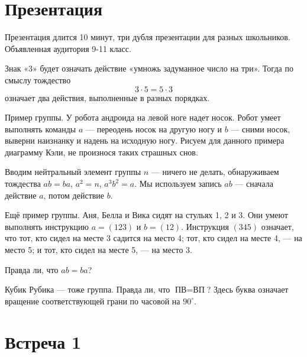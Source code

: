 \documentclass[a4paper, 12pt]{article}
\begin{document}
\section{Презентация}

Презентация длится 10 минут, три дубля презентации для разных школьников. 
Объявленная аудитория 9-11 класс.

Знак «3» будет означать действие «умножь задуманное число на три». Тогда по смыслу тождество
\[
3 \cdot 5 = 5 \cdot 3
\]
означает два действия, выполненные в разных порядках.

Пример группы. У робота андроида на левой ноге надет носок. Робот умеет выполнять команды $a$ — переодень носок на другую ногу и $b$ — сними носок, выверни наизнанку и надень на исходную ногу. Рисуем для данного примера диаграмму Кэли, не произнося таких страшных снов.

Вводим нейтральный элемент группы $n$ — ничего не делать, обнаруживаем тождества $ab=ba$, $a^2=n$, $a^3b^2=a$. Мы используем запись $ab$ — сначала действие $a$, потом действие $b$.

Ещё пример группы. Аня, Белла и Вика сидят на стульях 1, 2 и 3. Они умеют выполнять инструкцию $a=(123)$ и $b=(12)$. Инструкция $(345)$ означает, что тот, кто сидел на месте 3 садится на место 4; тот, кто сидел на месте 4, — на место 5; и тот, кто сидел на месте 5, — на место 3.

Правда ли, что $ab=ba$?

Кубик Рубика — тоже группа. Правда ли, что $\text{П}\text{В}=\text{В}\text{П}$? Здесь буква означает вращение соответствующей грани по часовой на $90^{\circ}$.

\section{Встреча 1}
\end{document}
